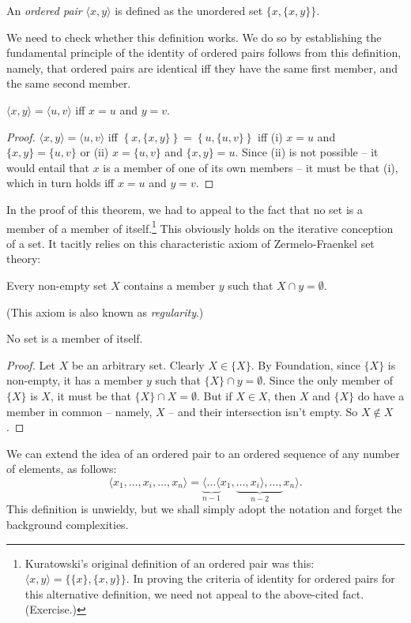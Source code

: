  \begin{definition} An {\em ordered pair} $\langle x, y\rangle$ is defined as the
unordered set
$\bigl\{x,\{x,y\}\bigr\}$.
\end{definition}
We need to check whether this definition works. We do so by establishing the fundamental principle of the identity of ordered pairs follows from this definition, namely, that ordered pairs are identical iff they have the same first member, and the same second member.
\begin{theorem}
$\langle x,y\rangle = \langle u,v\rangle$ iff $x=u$ and $y=v$.
\begin{proof}
	$\langle x,y\rangle = \langle u,v\rangle$ iff $\left\{x,\{x,y\}\right\} = \left\{u,\{u,v\}\right\}$ iff (i) $x=u$ and $\{x,y\} = \{u,v\}$ or (ii) $x=\{u,v\}$ and $\{x,y\}=u$. Since (ii) is not possible – it would entail that $x$ is a member of one of its own members – it must be that (i), which in turn holds iff $x=u$ and $y=v$.
\end{proof}
\end{theorem}
In the proof of this theorem, we had to appeal to the fact that no set is a member of a member of itself.\footnote{Kuratowski's original definition of an ordered pair was this: $\langle x,y\rangle = \{\{x\},\{x,y\}\}$. In proving the criteria of identity for ordered pairs for this alternative definition, we need not appeal to the above-cited fact. (Exercise.)} This obviously holds on the iterative conception of a set. It tacitly relies on this characteristic axiom of Zermelo-Fraenkel set theory: \begin{axiom}[Foundation]
	 Every non-empty set $X$ contains a member $y$  such that $X \cap y = \emptyset$.
\end{axiom} (This axiom is also known as \emph{regularity}.) \begin{theorem}
	No set is a member of itself. \begin{proof}
		Let $X$ be an arbitrary set. Clearly $X \in \{X\}$. By Foundation, since $\{X\}$ is non-empty, it has a member $y$ such that $\{X\} \cap y = \emptyset$. Since the only member of $\{X\}$ is $X$, it must be that $\{X\} \cap X = \emptyset$. But if $X\in X$, then $X$ and $\{X\}$ do have a member in common – namely, $X$ – and their intersection isn't empty. So $X \notin X$.
	\end{proof} 
\end{theorem}

We can extend the idea of an ordered pair to an ordered sequence of any number of elements, as follows: \begin{equation}\langle x_{1}, \ldots,
x_{i}, \ldots, x_{n}\rangle = \underbrace{\langle\ldots\langle}_{n-1} x_{1}, 
\underbrace{\ldots,x_{i}\rangle,\ldots,}_{n-2}
x_{n}\rangle.\end{equation}
This definition is unwieldy, but we shall simply adopt the notation and forget the background complexities.

